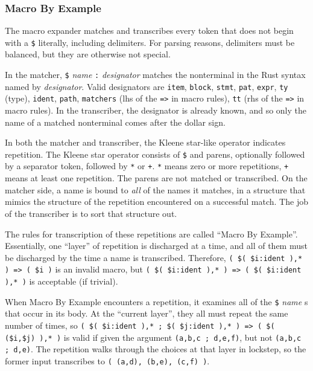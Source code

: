 \documentclass[]{article}
\begin{document}
\subsubsection{Macro By Example}\label{macro-by-example}

The macro expander matches and transcribes every token that does not
begin with a \texttt{\$} literally, including delimiters. For parsing
reasons, delimiters must be balanced, but they are otherwise not
special.

In the matcher, \texttt{\$} \emph{name} \texttt{:} \emph{designator}
matches the nonterminal in the Rust syntax named by \emph{designator}.
Valid designators are \texttt{item}, \texttt{block}, \texttt{stmt},
\texttt{pat}, \texttt{expr}, \texttt{ty} (type), \texttt{ident},
\texttt{path}, \texttt{matchers} (lhs of the \texttt{=\textgreater{}} in
macro rules), \texttt{tt} (rhs of the \texttt{=\textgreater{}} in macro
rules). In the transcriber, the designator is already known, and so only
the name of a matched nonterminal comes after the dollar sign.

In both the matcher and transcriber, the Kleene star-like operator
indicates repetition. The Kleene star operator consists of \texttt{\$}
and parens, optionally followed by a separator token, followed by
\texttt{*} or \texttt{+}. \texttt{*} means zero or more repetitions,
\texttt{+} means at least one repetition. The parens are not matched or
transcribed. On the matcher side, a name is bound to \emph{all} of the
names it matches, in a structure that mimics the structure of the
repetition encountered on a successful match. The job of the transcriber
is to sort that structure out.

The rules for transcription of these repetitions are called ``Macro By
Example''. Essentially, one ``layer'' of repetition is discharged at a
time, and all of them must be discharged by the time a name is
transcribed. Therefore,
\texttt{( \$( \$i:ident ),* ) =\textgreater{} ( \$i )} is an invalid
macro, but
\texttt{( \$( \$i:ident ),* ) =\textgreater{} ( \$( \$i:ident ),*  )} is
acceptable (if trivial).

When Macro By Example encounters a repetition, it examines all of the
\texttt{\$} \emph{name} s that occur in its body. At the ``current
layer'', they all must repeat the same number of times, so
\texttt{( \$( \$i:ident ),* ; \$( \$j:ident ),* ) =\textgreater{} ( \$( (\$i,\$j) ),* )}
is valid if given the argument \texttt{(a,b,c ; d,e,f)}, but not
\texttt{(a,b,c ; d,e)}. The repetition walks through the choices at that
layer in lockstep, so the former input transcribes to
\texttt{( (a,d), (b,e), (c,f) )}.
\end{document}
